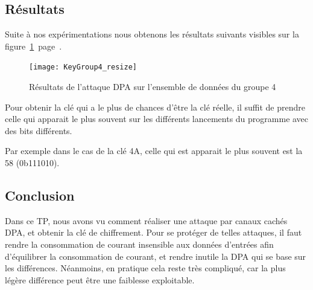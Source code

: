\subsection{Résultats}

Suite à nos expérimentations nous obtenons les résultats suivants visibles
sur la figure~\ref{fig:resultsDPA}~page~\pageref{fig:resultsDPA}.

\begin{figure}[h!]
\centering
	\texttt{[image: KeyGroup4\_resize]}
	\caption{Résultats de l'attaque DPA sur l'ensemble
		de données du groupe 4}
	\label{fig:resultsDPA}
\end{figure}

Pour obtenir la clé qui a le plus de chances d'être la clé réelle, il suffit
de prendre celle qui apparait le plus souvent sur les différents lancements
du programme avec des bits différents.

Par exemple dans le cas de la clé 4A, celle qui est apparait le plus souvent est
la 58 (0b111010).

\subsection{Conclusion}

Dans ce TP, nous avons vu comment réaliser une attaque par canaux cachés DPA, et
obtenir la clé de chiffrement. Pour se protéger de telles attaques, il faut
rendre la consommation de courant insensible aux données d'entrées afin
d'équilibrer la consommation de courant, et rendre inutile la DPA qui se base
sur les différences. Néanmoins, en pratique cela reste très compliqué, car la
plus légère différence peut être une faiblesse exploitable.

